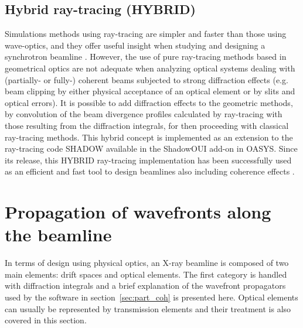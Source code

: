 \documentclass{iucr}              %
\begin{document}


\subsection{Hybrid ray-tracing (HYBRID)}

Simulations methods using ray-tracing are simpler and faster than those using wave-optics, and they offer useful insight when studying and designing a synchrotron beamline \cite{hierarchical}. However, the use of pure ray-tracing methods based in geometrical optics are not adequate when analyzing optical systems dealing with (partially- or fully-) coherent beams subjected to strong diffraction effects (e.g. beam clipping by either physical acceptance of an optical element or by slits and optical errors). It is possible to add diffraction effects to the geometric methods, by convolution of the beam divergence profiles calculated by ray-tracing with those resulting from the diffraction integrals, for then proceeding with classical ray-tracing methods. This hybrid concept \cite{codeHYBRID} is implemented as an extension to the ray-tracing code SHADOW \cite{codeSHADOW} available in the ShadowOUI \cite{codeSHADOWOUI} add-on in OASYS. Since its release, this HYBRID ray-tracing implementation has been successfully used as an efficient and fast tool to design beamlines also including coherence effects \cite{Shi2017,Luca2020, Lordano2022}.

\section{Propagation of wavefronts along the beamline\\}\label{sec:propagation}

 In terms of design using physical optics, an X-ray beamline is composed of two main elements: drift spaces and optical elements. The first category is handled with diffraction integrals and a brief explanation of the wavefront propagators used by the software in section~\ref{sec:part_coh} is presented here. Optical elements can usually be represented by transmission elements and their treatment is also covered in this section. 
\end{document}
